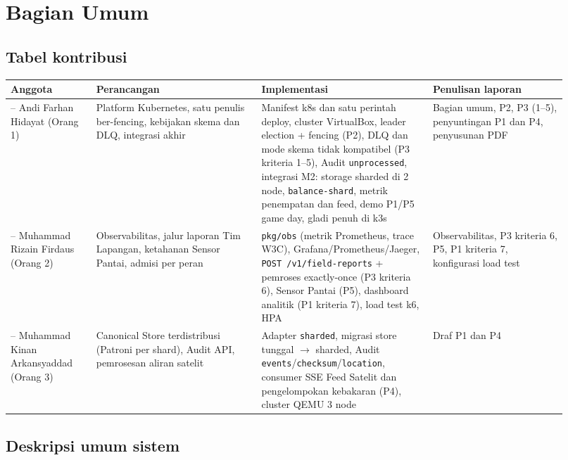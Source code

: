 \chapter{Bagian Umum}

\section{Tabel kontribusi}

{\small
\begin{longtable}{@{}>{\raggedright\arraybackslash}p{0.145\linewidth}>{\raggedright\arraybackslash}p{0.273\linewidth}>{\raggedright\arraybackslash}p{0.283\linewidth}>{\raggedright\arraybackslash}p{0.221\linewidth}@{}}
\toprule
\textbf{Anggota} & \textbf{Perancangan} & \textbf{Implementasi} & \textbf{Penulisan laporan} \\
\midrule
\endhead
13523128 -- Andi Farhan Hidayat (Orang 1) & Platform Kubernetes, satu penulis ber-fencing, kebijakan skema dan DLQ, integrasi akhir & Manifest k8s dan satu perintah deploy, cluster VirtualBox, leader election + fencing (P2), DLQ dan mode skema tidak kompatibel (P3 kriteria 1--5), Audit \texttt{unprocessed}, integrasi M2: storage sharded di 2 node, \texttt{balance-\allowbreak{}shard}, metrik penempatan dan feed, demo P1/P5 game day, gladi penuh di k3s & Bagian umum, P2, P3 (1--5), penyuntingan P1 dan P4, penyusunan PDF \\
13523164 -- Muhammad Rizain Firdaus (Orang 2) & Observabilitas, jalur laporan Tim Lapangan, ketahanan Sensor Pantai, admisi per peran & \texttt{pkg/\allowbreak{}obs} (metrik Prometheus, trace W3C), Grafana/Prometheus/Jaeger, \texttt{POST /\allowbreak{}v1/\allowbreak{}field-\allowbreak{}reports} + pemroses exactly-once (P3 kriteria 6), Sensor Pantai (P5), dashboard analitik (P1 kriteria 7), load test k6, HPA & Observabilitas, P3 kriteria 6, P5, P1 kriteria 7, konfigurasi load test \\
13523152 -- Muhammad Kinan Arkansyaddad (Orang 3) & Canonical Store terdistribusi (Patroni per shard), Audit API, pemrosesan aliran satelit & Adapter \texttt{sharded}, migrasi store tunggal $\rightarrow$ sharded, Audit \texttt{events}/\texttt{checksum}/\texttt{location}, consumer SSE Feed Satelit dan pengelompokan kebakaran (P4), cluster QEMU 3 node & Draf P1 dan P4 \\
\bottomrule
\end{longtable}
}

\section{Deskripsi umum sistem}

